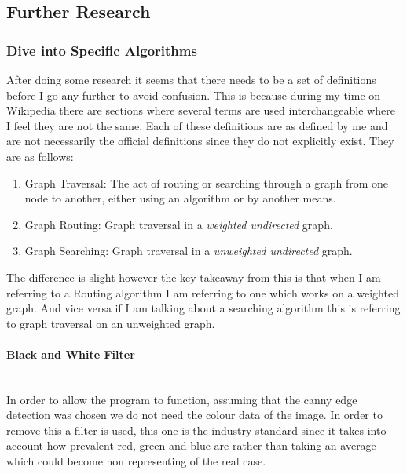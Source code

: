 \begin{FlushLeft}
        \subsection{Further Research}
            \subsubsection{Dive into Specific Algorithms}
            After doing some research it seems that there needs to be a set of definitions before I go any further to avoid confusion. This is because during my time on Wikipedia there are sections
            where several terms are used interchangeable where I feel they are not the same. Each of these definitions are as defined by me and are not necessarily the official definitions since they 
            do not explicitly exist. They are as follows: \\ \bk
            \begin{enumerate}
                \item Graph Traversal: The act of routing or searching through a graph from one node to another, either using an algorithm or by another means.
                \item Graph Routing: Graph traversal in a \emph{weighted undirected} graph.
                \item Graph Searching: Graph traversal in a \emph{unweighted undirected} graph.
            \end{enumerate}

            \bk
            The difference is slight however the key takeaway from this is that when I am referring to a Routing algorithm I am referring to one which works on a weighted graph. And vice versa if I am 
            talking about a searching algorithm this is referring to graph traversal on an unweighted graph. \\ \bk

            \paragraph{Black and White Filter}\mbox{} \\
            In order to allow the program to function, assuming that the canny edge detection was chosen we do not need the colour data of the image. In order to remove this a filter is used, this one is the
            industry standard since it takes into account how prevalent red, green and blue are rather than taking an average which could become non representing of the real case. \\ \bk
            

\end{FlushLeft}
